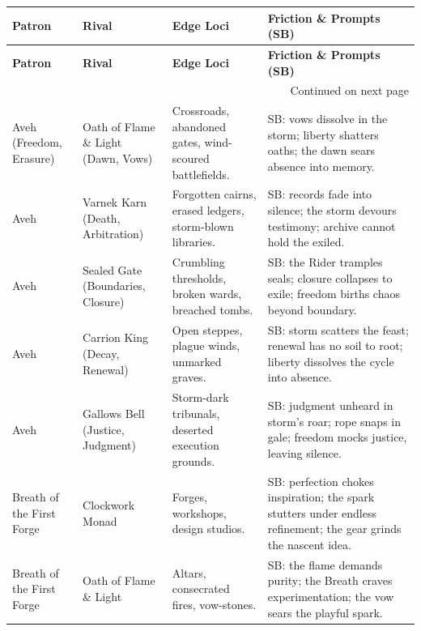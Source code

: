 \begin{longtable}{@{}p{3.3cm}p{3.3cm}p{4.6cm}p{7.2cm}@{}}
  \toprule
  \textbf{Patron} & \textbf{Rival} & \textbf{Edge Loci} & \textbf{Friction \& Prompts (SB)} \\
  \midrule
  \endfirsthead

  \toprule
  \textbf{Patron} & \textbf{Rival} & \textbf{Edge Loci} & \textbf{Friction \& Prompts (SB)} \\
  \midrule
  \endhead

  \midrule
  \multicolumn{4}{r}{{Continued on next page}} \\
  \endfoot

  \bottomrule
  \endlastfoot

  Aveh (Freedom, Erasure) & Oath of Flame \& Light (Dawn, Vows) &
  Crossroads, abandoned gates, wind-scoured battlefields. &
  SB: vows dissolve in the storm; liberty shatters oaths; the dawn sears absence into memory. \\

  Aveh & Varnek Karn (Death, Arbitration) &
  Forgotten cairns, erased ledgers, storm-blown libraries. &
  SB: records fade into silence; the storm devours testimony; archive cannot hold the exiled. \\

  Aveh & Sealed Gate (Boundaries, Closure) &
  Crumbling thresholds, broken wards, breached tombs. &
  SB: the Rider tramples seals; closure collapses to exile; freedom births chaos beyond boundary. \\

  Aveh & Carrion King (Decay, Renewal) &
  Open steppes, plague winds, unmarked graves. &
  SB: storm scatters the feast; renewal has no soil to root; liberty dissolves the cycle into absence. \\

  Aveh & Gallows Bell (Justice, Judgment) &
  Storm-dark tribunals, deserted execution grounds. &
  SB: judgment unheard in storm's roar; rope snaps in gale; freedom mocks justice, leaving silence. \\

  Breath of the First Forge & Clockwork Monad &
  Forges, workshops, design studios. &
  SB: perfection chokes inspiration; the spark stutters under endless refinement; the gear grinds the nascent idea. \\

  Breath of the First Forge & Oath of Flame \& Light &
  Altars, consecrated fires, vow-stones. &
  SB: the flame demands purity; the Breath craves experimentation; the vow sears the playful spark. \\


\end{longtable}
